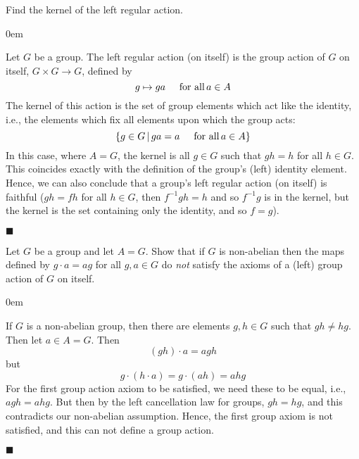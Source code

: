 \documentclass[12pt]{article}
\renewcommand{\qed}{\hfill$\blacksquare$}
\renewenvironment{proof}{\begin{addmargin}[1em]{0em}\begin{newproof}}{\end{newproof}\end{addmargin}\qed}
\newenvironment{problem}[2][Exercise]{\begin{trivlist}
\item[\hskip \labelsep {\bfseries #1}\hskip \labelsep {\bfseries #2.}]}{\end{trivlist}}
\begin{document}
\begin{problem}{1.7.13}
Find the kernel of the left regular action.
\end{problem}
\begin{proof}
Let $G$ be a group. The left regular action (on itself) is the group action of $G$ on itself, $G\times G\rightarrow G$, defined by $$ g\mapsto ga \hspace{5mm} \text{for all} \, a\in A $$ The kernel of this action is the set of group elements which act like the identity, i.e., the elements which fix all elements upon which the group acts: $$ \left\{ g\in G \, | \, ga = a \hspace{5mm} \text{for all}\, a\in A\right\} $$ In this case, where $A=G$, the kernel is all $g\in G$ such that $gh=h$ for all $h\in G$. This coincides exactly with the definition of the group's (left) identity element. Hence, we can also conclude that a group's left regular action (on itself) is faithful ($gh=fh$ for all $h\in G$, then $f^{-1}g h = h$ and so $f^{-1}g$ is in the kernel, but the kernel is the set containing only the identity, and so $f=g$).
\end{proof}




\begin{problem}{1.7.14}
Let $G$ be a group and let $A=G$. Show that if $G$ is non-abelian then the maps defined by $g\cdot a = ag$ for all $g,a\in G$ do \textit{not} satisfy the axioms of a (left) group action of $G$ on itself.
\end{problem}
\begin{proof}
If $G$ is a non-abelian group, then there are elements $g,h\in G$ such that $gh\neq hg$. Then let $a\in A=G$. Then
$$ \left(gh\right)\cdot a = agh$$ but
$$ g\cdot \left(h\cdot a\right) = g \cdot \left(ah\right) = ahg $$ For the first group action axiom to be satisfied, we need these to be equal, i.e., $agh=ahg$. But then by the left cancellation law for groups, $gh=hg$, and this contradicts our non-abelian assumption. Hence, the first group axiom is not satisfied, and this can not define a group action.
\end{proof}
\end{document}
